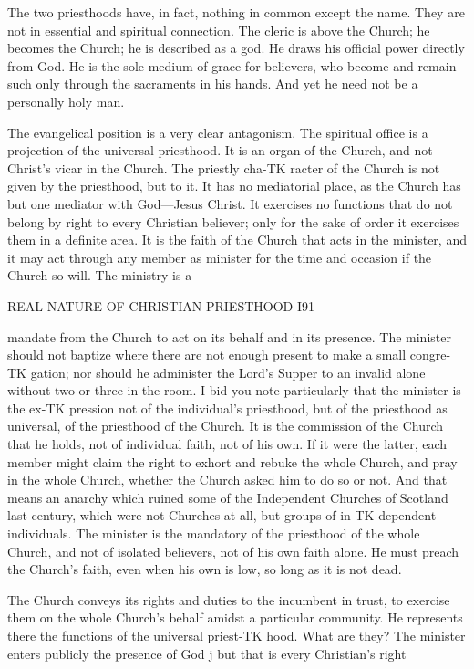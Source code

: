 \documentclass[12pt,a5paper,oneside]{book}
\begin{document}
{The two priesthoods have, in fact, nothing in 
common except the name. They are not in essential 
and spiritual connection. The cleric is above the 
Church; he becomes the Church; he is described as 
a god. He draws his official power directly from God. 
He is the sole medium of grace for believers, who 
become and remain such only through the sacraments 
in his hands. And yet he need not be a personally 
holy man. 

The evangelical position is a very clear antagonism. 
The spiritual office is a projection of the universal 
priesthood. It is an organ of the Church, and not 
Christ's vicar in the Church. The priestly cha-TK
racter of the Church is not given by the priesthood, 
but to it. It has no mediatorial place, as the Church 
has but one mediator with God---Jesus Christ. It 
exercises no functions that do not belong by right to 
every Christian believer; only for the sake of order it 
exercises them in a definite area. It is the faith of the 
Church that acts in the minister, and it may act 
through any member as minister for the time and 
occasion if the Church so will. The ministry is a 



REAL NATURE OF CHRISTIAN PRIESTHOOD I91 

mandate from the Church to act on its behalf and in 
its presence. The minister should not baptize where 
there are not enough present to make a small congre-TK
gation; nor should he administer the Lord's Supper 
to an invalid alone without two or three in the room. 
I bid you note particularly that the minister is the ex-TK
pression not of the individual's priesthood, but of the 
priesthood as universal, of the priesthood of the Church. 
It is the commission of the Church that he holds, not 
of individual faith, not of his own. If it were the 
latter, each member might claim the right to exhort 
and rebuke the whole Church, and pray in the whole 
Church, whether the Church asked him to do so or 
not. And that means an anarchy which ruined some 
of the Independent Churches of Scotland last century, 
which were not Churches at all, but groups of in-TK
dependent individuals. The minister is the mandatory 
of the priesthood of the whole Church, and not of 
isolated believers, not of his own faith alone. He 
must preach the Church's faith, even when his own 
is low, so long as it is not dead. 

The Church conveys its rights and duties to the 
incumbent in trust, to exercise them on the whole 
Church's behalf amidst a particular community. He 
represents there the functions of the universal priest-TK
hood. What are they? The minister enters publicly the 
presence of God j but that is every Christian's right 



}
\end{document}
